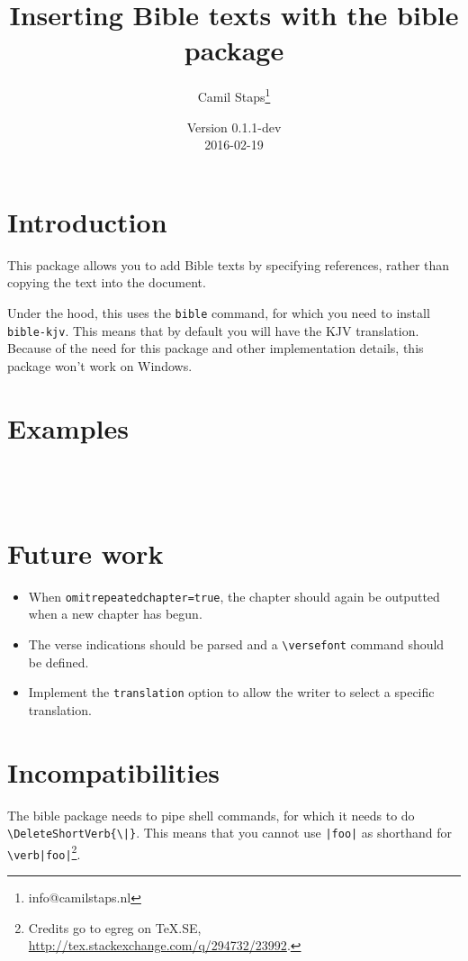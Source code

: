 \documentclass[a4paper]{ltxguide}
\title{Inserting Bible texts with the \textsf{bible} package}
\author{Camil Staps\footnote{info@camilstaps.nl}}
\date{Version 0.1.1-dev\\2016-02-19}
\newenvironment{example}
	{\VerbatimOut{\jobname.tmp}}
	{\endVerbatimOut%
		\begin{framed}
			\setlength{\parskip}{-10pt}
			\inputminted[gobble=8]{latex}{\jobname.tmp}
			\medskip
			
		\end{framed}}
\begin{document}
\maketitle

\section{Introduction}
This package allows you to add Bible texts by specifying references, rather
than copying the text into the document.

Under the hood, this uses the \texttt{bible} command, for which you need to
install \texttt{bible-kjv}. This means that by default you will have the KJV
translation. Because of the need for this package and other implementation
details, this package won't work on Windows.

\section{Examples}
\begin{example}
\end{example}

\begin{example}
\end{example}

\begin{example}
\end{example}

\begin{example}
\end{example}

\section{Future work}
\begin{itemize}
	\item When \verb$omitrepeatedchapter=true$, the chapter should again be
		outputted when a new chapter has begun.
	\item The verse indications should be parsed and a \verb$\versefont$ command
		should be defined.
	\item Implement the \verb$translation$ option to allow the writer to select a
		specific translation.
\end{itemize}

\section{Incompatibilities}
The \textsf{bible} package needs to pipe shell commands, for which it needs to
do \verb$\DeleteShortVerb{\|}$. This means that you cannot use \verb$|foo|$ as
shorthand for \verb$\verb|foo|$\footnote{Credits go to egreg on TeX.SE,
\url{http://tex.stackexchange.com/q/294732/23992}.}.
\end{document}
